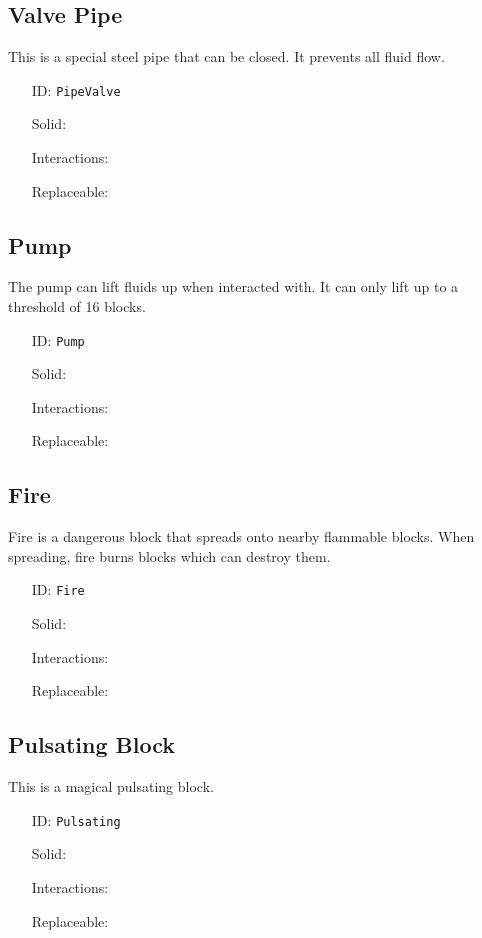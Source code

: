 \subsection{Valve Pipe}\label{subsec:blocks_valve pipe}
This is a special steel pipe that can be closed. It prevents all fluid flow.
\newline
\begin{itemize}[nosep]
    \item[ID:] \texttt{PipeValve}
    \item[Solid:]  \Checkmark \item[Interactions:]  \Checkmark \item[Replaceable:]  \XSolidBrush
\end{itemize}

\subsection{Pump}\label{subsec:blocks_pump}
The pump can lift fluids up when interacted with.
It can only lift up to a threshold of 16 blocks.
\newline
\begin{itemize}[nosep]
    \item[ID:] \texttt{Pump}
    \item[Solid:]  \Checkmark \item[Interactions:]  \Checkmark \item[Replaceable:]  \XSolidBrush
\end{itemize}

\subsection{Fire}\label{subsec:blocks_fire}
Fire is a dangerous block that spreads onto nearby flammable blocks.
When spreading, fire burns blocks which can destroy them.
\newline
\begin{itemize}[nosep]
    \item[ID:] \texttt{Fire}
    \item[Solid:]  \XSolidBrush \item[Interactions:]  \XSolidBrush \item[Replaceable:]  \Checkmark
\end{itemize}

\subsection{Pulsating Block}\label{subsec:blocks_pulsating block}
This is a magical pulsating block.
\newline
\begin{itemize}[nosep]
    \item[ID:] \texttt{Pulsating}
    \item[Solid:]  \Checkmark \item[Interactions:]  \Checkmark \item[Replaceable:]  \XSolidBrush
\end{itemize}

